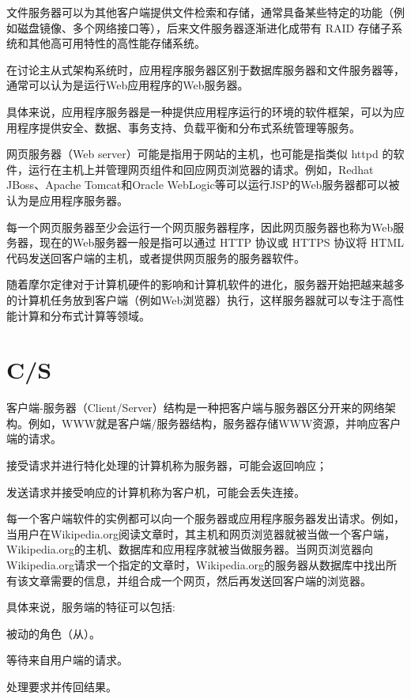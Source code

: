 文件服务器可以为其他客户端提供文件检索和存储，通常具备某些特定的功能（例如磁盘镜像、多个网络接口等），后来文件服务器逐渐进化成带有 RAID 存储子系统和其他高可用特性的高性能存储系统。


在讨论主从式架构系统时，应用程序服务器区别于数据库服务器和文件服务器等，通常可以认为是运行Web应用程序的Web服务器。

具体来说，应用程序服务器是一种提供应用程序运行的环境的软件框架，可以为应用程序提供安全、数据、事务支持、负载平衡和分布式系统管理等服务。


网页服务器（Web server）可能是指用于网站的主机，也可能是指类似 httpd 的软件，运行在主机上并管理网页组件和回应网页浏览器的请求。例如，Redhat JBoss、Apache Tomcat和Oracle WebLogic等可以运行JSP的Web服务器都可以被认为是应用程序服务器。

每一个网页服务器至少会运行一个网页服务器程序，因此网页服务器也称为Web服务器，现在的Web服务器一般是指可以通过 HTTP 协议或 HTTPS 协议将 HTML 代码发送回客户端的主机，或者提供网页服务的服务器软件。

随着摩尔定律对于计算机硬件的影响和计算机软件的进化，服务器开始把越来越多的计算机任务放到客户端（例如Web浏览器）执行，这样服务器就可以专注于高性能计算和分布式计算等领域。



\section{C/S}



客户端-服务器（Client/Server）结构是一种把客户端与服务器区分开来的网络架构。例如，WWW就是客户端/服务器结构，服务器存储WWW资源，并响应客户端的请求。

\begin{compactitem}
\item 接受请求并进行特化处理的计算机称为服务器，可能会返回响应；
\item 发送请求并接受响应的计算机称为客户机，可能会丢失连接。
\end{compactitem}


每一个客户端软件的实例都可以向一个服务器或应用程序服务器发出请求。例如，当用户在Wikipedia.org阅读文章时，其主机和网页浏览器就被当做一个客户端，Wikipedia.org的主机、数据库和应用程序就被当做服务器。当网页浏览器向Wikipedia.org请求一个指定的文章时，Wikipedia.org的服务器从数据库中找出所有该文章需要的信息，并组合成一个网页，然后再发送回客户端的浏览器。

具体来说，服务端的特征可以包括:

\begin{compactitem}
\item 被动的角色（从）。
\item 等待来自用户端的请求。
\item 处理要求并传回结果。
\end{compactitem}

